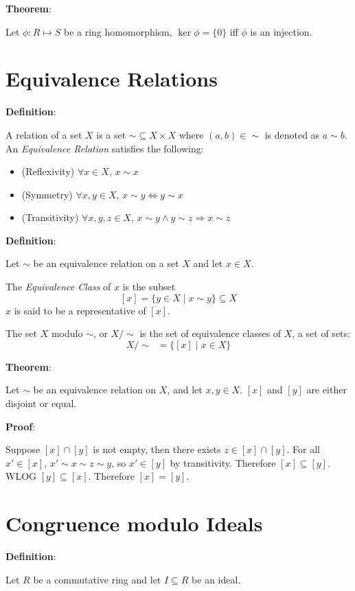 \documentclass{article}
\begin{document}
\begin{multicols*}{2}
\textbf{Theorem}:

Let $\phi : R \mapsto S$ be a ring homomorphism, $\ker\phi = \{0\}$ iff $\phi$ is an injection.

\section{Equivalence Relations}


\textbf{Definition}:

A relation of a set $X$ is a set $\sim \subseteq X \times X$ where $(a, b) \in \sim$ is denoted as $a \sim b$. An \textit{Equivalence Relation} satisfies the following:

\begin{itemize}
    \item (Reflexivity) $\forall x \in X$, $x \sim x$
    \item (Symmetry) $\forall x, y \in X$, $x \sim y \Leftrightarrow y \sim x$
    \item (Transitivity) $\forall x, y, z \in X$, $x \sim y \wedge y \sim z \Rightarrow x \sim z$
\end{itemize}

\textbf{Definition}:

Let $\sim$ be an equivalence relation on a set $X$ and let $x \in X$.

The \textit{Equivalence Class} of $x$ is the subset \[[x] = \{y \in X \;|\; x \sim y\} \subseteq X\] $x$ is said to be a representative of $[x]$.

The set $X$ modulo $\sim$, or $X/\sim$ is the set of equivalence classes of $X$, a set of sets: \[X/\sim \;\;= \{[x] \;|\; x \in X\}\]

\textbf{Theorem}:

Let $\sim$ be an equivalence relation on $X$, and let $x, y \in X$. $[x]$ and $[y]$ are either disjoint or equal.

\textbf{Proof}:

Suppose $[x] \cap [y]$ is not empty, then there exists $z \in[x] \cap [y]$. For all $x' \in [x]$, $x' \sim x \sim z \sim y$, so $x' \in [y]$ by transitivity. Therefore $[x] \subseteq [y]$. WLOG $[y] \subseteq [x]$. Therefore $[x] = [y]$.

\section{Congruence modulo Ideals}

\textbf{Definition}:

Let $R$ be a commutative ring and let $I \subseteq R$ be an ideal.


\end{multicols*}
\end{document}
